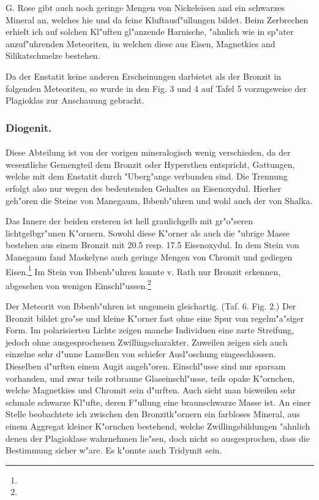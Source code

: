 \documentclass[a4paper, 11pt, oneside, polutonikogreek, german]{article}
\begin{document}
G. Rose gibt auch noch geringe Mengen von Nickeleisen and ein schwarzes Mineral an, welches hie und da feine Kluftausf"ullungen bildet. Beim Zerbrechen erhielt ich auf solchen Kl"uften gl"anzende Harnische, "ahnlich wie in sp"ater anzuf"uhrenden Meteoriten, in welchen diese aus Eisen, Magnetkies and Silikatschmelze bestehen.

Da der Enstatit keine anderen Erscheinungen darbietet als der Bronzit in folgenden Meteoriten, so wurde in den Fig. 3 und 4 auf Tafel 5 vorzugsweise der Plagioklas zur Anschauung gebracht.

\subsubsection{Diogenit.}
\paragraph{}
Diese Abteilung ist von der vorigen mineralogisch wenig verschieden, da der wesentliche Gemengteil dem Bronzit oder Hypersthen entspricht, Gattungen, welche mit dem Enstatit durch "Uberg"ange verbunden sind. Die Trennung erfolgt also nur wegen des bedeutenden Gehaltes an Eisenoxydul. Hierher geh"oren die Steine von Manegaum, Ibbenb"uhren und wohl auch der von Shalka.

Das Innere der beiden ersteren ist hell graulichgelb mit gr"o"seren lichtgelbgr"unen K"ornern. Sowohl diese K"orner als auch die "ubrige Masse bestehen aus einem Bronzit mit 20.5 resp. 17.5 Eisenoxydul. In dem Stein von Manegaum fand Maskelyne auch geringe Mengen von Chromit und gediegen Eisen.\footnote{} Im Stein von Ibbenb"uhren konnte v. Rath nur Bronzit erkennen, abgesehen von wenigen Einschl"ussen.\footnote{}

Der Meteorit von Ibbenb"uhren ist ungemein gleichartig. (Taf. 6. Fig. 2.) Der Bronzit bildet gro"se und kleine K"orner fast ohne eine Spur von regelm"a"siger Form. Im polarisierten Lichte zeigen manche Individuen eine zarte Streifung, jedoch ohne ausgesprochenen Zwillingscharakter. Zuweilen zeigen sich auch einzelne sehr d"unne Lamellen von schiefer Ausl"oschung eingeschlossen. Dieselben d"urften einem Augit angeh"oren. Einschl"usse sind nur sparsam vorhanden, und zwar teils rotbraune Glaseinschl"usse, teils opake K"ornchen, welche Magnetkies und Chromit sein d"urften. Auch sieht man bisweilen sehr schmale schwarze Kl"ufte, deren F"ullung eine braunschwarze Masse ist. An einer Stelle beobachtete ich zwischen den Bronzitk"ornern ein farbloses Mineral, aus einem Aggregat kleiner K"ornchen bestehend, welche Zwillingsbildungen "ahnlich denen der Plagioklase wahrnehmen lie"sen, doch nicht so ausgesprochen, dass die Bestimmung sicher w"are. Es k"onnte auch Tridymit sein.
\end{document}
